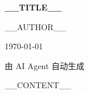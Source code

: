 \documentclass[12pt,a4paper]{ctexart}
\begin{document}
\begin{titlepage}
    \begin{center}
        \vspace*{3cm}

        {\heiti{}\textbf{__TITLE__}}

        \vspace{4cm}

        {\songti{}__AUTHOR__}

        \vspace{2cm}

        {\songti{}\today}

        \vspace{2cm}

        {\songti{}由 AI Agent 自动生成}

    \end{center}
\end{titlepage}

\tableofcontents
\newpage

__CONTENT__
\end{document}
